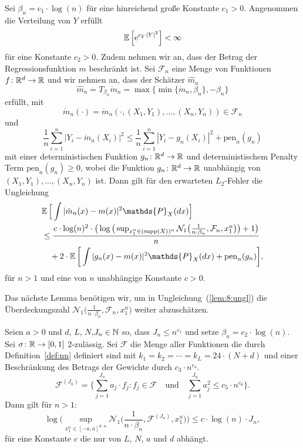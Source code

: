 {  \begin{lem}
  \label{lem:8}
Sei $\beta_n = c_1 \cdot \log(n)$ für eine hinreichend große Konstante $c_1 > 0$. Angenommen die Verteilung von $Y$ erfüllt 
$$ \mathbb{E}\,\Big[\mathrm{e}^{c_2 \cdot |Y|^2}\Big] < \infty$$
für eine Konstante $c_2 > 0.$ Zudem nehmen wir an, dass der Betrag der Regressionsfunktion $m$ beschränkt ist. Sei $\mathcal{F}_n$ eine Menge von Funktionen $f\colon \mathbb{R}^d \to \mathbb{R}$ und wir nehmen an, dass der Schätzer $\hat{m}_n$ 
$$\hat{m}_n = T_{\beta_n}\mathring{m}_n = \max\{\min\{\mathring{m}_n, \beta_n\}, -\beta_n\}$$ 
erfüllt, mit 
$$\mathring{m}_n(\cdot) = \mathring{m}_n(\cdot,(X_1, Y_1),\dots,(X_n, Y_n)) \in \mathcal{F}_n$$
und 
\begin{equation}
\label{lem:8:bed:1}
\frac{1}{n} \sum_{i = 1}^n |Y_i - \mathring{m}_n(X_i)|^2 \leq \frac{1}{n}\sum_{i = 1}^n |Y_i - g_{n}(X_i)|^2 + \mathrm{pen}_n(g_n)
\end{equation}
mit einer deterministischen Funktion $g_{n}\colon \mathbb{R}^d \to \mathbb{R}$ und deterministischem Penalty Term $\mathrm{pen}_n(g_{n}) \geq 0$, wobei die Funktion $g_{n}\colon \mathbb{R}^d \to \mathbb{R}$ unabhängig von $(X_1, Y_1),\dots,(X_n,Y_n)$ ist.
Dann gilt für den erwarteten $L_2$-Fehler die Ungleichung
\begin{equation}
\label{lem:8:ungl}
\begin{split}
& \E \Big[\int |\hat{m}_n(x) - m(x)|^2 \mathds{P}_X(dx)\Big] \\
& \leq \frac{c \cdot \log(n)^2 \cdot \big(\log\big(\sup_{x_1^n \in (\supp(X))^n}\mathcal{N}_1\big(\frac{1}{n \cdot \beta_n},\mathcal{F}_n,x_1^n\big)\big) + 1\big)}{n} \\
& \quad + 2 \cdot \E\bigg[\int |g_{n}(x) - m(x)|^2 \mathds{P}_X(dx) + \mathrm{pen}_n(g_{n})\bigg],
\end{split}
\end{equation}
für $n > 1$ und eine von $n$ unabhängige Konstante $c > 0$.
  \end{lem}
Das nächste Lemma benötigen wir, um in Ungleichung~(\ref{lem:8:ungl}) die Überdeckungszahl $\mathcal{N}_1\big(\frac{1}{n \cdot \beta_n},\mathcal{F}_n,x_1^n\big)$ weiter abzuschätzen.
\begin{lem}
\label{lem:9}
Seien $a > 0$ und $d$, $L$, $N$,$ J_n \in \mathbb{N}$ so, dass $J_n \leq n^{c_{1}}$ und setze $\beta_n = c_2 \cdot \log(n).$
Sei $\sigma\colon \mathbb{R} \to [0, 1]$ 2-zulässig. Sei $\mathcal{F}$ die Menge aller Funktionen die durch Definition~\ref{def:nn} definiert sind mit $k_1 = k_2 = \cdots = k_L = 24 \cdot (N + d)$ und einer Beschränkung des Betrags der Gewichte durch $c_{3} \cdot n^{c_{4}}$.
$$ \mathcal{F}^{(J_n)} = \biggl\{\sum_{j = 1}^{J_n} a_j \cdot f_j : f_j \in \mathcal{F} \quad \text{und} \quad \sum_{j = 1}^{J_n} a_j^2 \leq c_{5} \cdot n^{c_{6}}\biggr\}.$$
Dann gilt für $n > 1$:
$$\log\bigg(\sup_{x_1^n\in[-a,a]^{d \cdot n}} \mathcal{N}_1\bigg(\frac{1}{n \cdot \beta_n}, \mathcal{F}^{(J_n)},x_1^n\bigg)\bigg) \leq c \cdot \log(n) \cdot J_n,$$
für eine Konstante $c$ die nur von $L$, $N$, $a$ und $d$ abhängt.
\end{lem}

}
